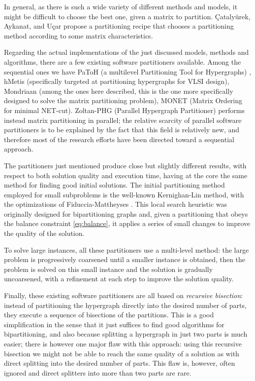 In general, as there is such a wide variety of different methods and models, it might be difficult to choose the best one, given a matrix to partition. {\c{C}}ataly{\"u}rek, Aykanat, and U{\c{c}}ar propose a partitioning recipe \cite{catalyurek_recipe} that chooses a partitioning method according to some matrix characteristics.

Regarding the actual implementations of the just discussed models, methods and algorithms, there are a few existing software partitioners available. Among the sequential ones we have PaToH (a multilevel Partitioning Tool for Hypergraphs) \cite{patoh}, hMetis \cite{hmetis} (specifically targeted at partitioning hypergraphs for VLSI design), Mondriaan \cite{mondriaan} (among the ones here described, this is the one more specifically designed to solve the matrix partitioning problem), MONET (Matrix Ordering for minimal NET-cut)\cite{hu2000}. Zoltan-PHG (Parallel Hypergraph Partitioner) \cite{parallel_hypergraph} performs instead matrix partitioning in parallel; the relative scarcity of parallel software partitioners is to be explained by the fact that this field is relatively new, and therefore most of the research efforts have been directed toward a sequential approach.

The partitioners just mentioned produce close but slightly different results, with respect to both solution quality and execution time, having at the core the same method for finding good initial solutions. The initial partitioning method employed for small subproblems is the well-known Kernighan-Lin \cite{kernighan_lin} method, with the optimizations of Fiduccia-Mattheyses \cite{fiduccia}. This local search heuristic was originally designed for bipartitioning graphs and, given a partitioning that obeys the balance constraint \eqref{eq:balance}, it applies a series of small changes to improve the quality of the solution.

To solve large instances, all these partitioners use a multi-level method: the large problem is progressively coarsened until a smaller instance is obtained, then the problem is solved on this small instance and the solution is gradually uncoarsened, with a refinement at each step to improve the solution quality.

Finally, these existing software partitioners are all based on \emph{recursive bisection}: instead of partitioning the hypergraph directly into the desired number of parts, they execute a sequence of bisections of the partitions. This is a good simplification in the sense that it just suffices to find good algorithms for bipartitioning, and also because splitting a hypergraph in just two parts is much easier; there is however one major flaw with this approach: using this recursive bisection  we might not be able to reach the same quality of a solution as with direct splitting into the desired number of parts. This flaw is, however, often ignored and direct splitters into more than two parts are rare.

